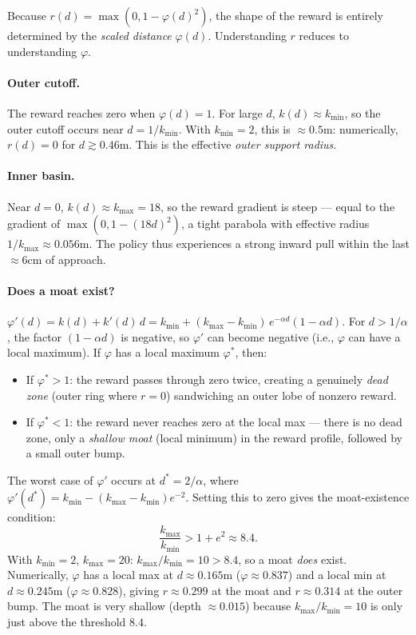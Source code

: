 \documentclass{article}
\begin{document}
Because $r(d) = \max(0, 1 - \varphi(d)^2)$, the shape of the reward is entirely
determined by the \emph{scaled distance} $\varphi(d)$. Understanding $r$ reduces to
understanding $\varphi$.

\paragraph{Outer cutoff.}
The reward reaches zero when $\varphi(d) = 1$. For large $d$, $k(d) \approx k_{\min}$,
so the outer cutoff occurs near $d = 1/k_{\min}$. With $k_{\min}=2$, this is $\approx 0.5$m:
numerically, $r(d) = 0$ for $d \gtrsim 0.46$m. This is the effective \emph{outer support radius}.

\paragraph{Inner basin.}
Near $d=0$, $k(d) \approx k_{\max} = 18$, so the reward gradient is steep ---
equal to the gradient of $\max(0, 1-(18d)^2)$, a tight parabola with effective radius
$1/k_{\max} \approx 0.056$m. The policy thus experiences a strong inward pull within
the last $\approx 6$cm of approach.

\paragraph{Does a moat exist?}
$\varphi'(d) = k(d) + k'(d)\,d = k_{\min} + (k_{\max}-k_{\min})\,e^{-\alpha d}(1 - \alpha d)$.
For $d > 1/\alpha$, the factor $(1-\alpha d)$ is negative, so $\varphi'$ can become
negative (i.e., $\varphi$ can have a local maximum). If $\varphi$ has a local maximum
$\varphi^*$, then:
\begin{itemize}
    \item If $\varphi^* > 1$: the reward passes through zero twice, creating a
    genuinely \emph{dead zone} (outer ring where $r=0$) sandwiching an outer lobe
    of nonzero reward.
    \item If $\varphi^* < 1$: the reward never reaches zero at the local max ---
    there is no dead zone, only a \emph{shallow moat} (local minimum) in the
    reward profile, followed by a small outer bump.
\end{itemize}
The worst case of $\varphi'$ occurs at $d^* = 2/\alpha$, where
$\varphi'(d^*) = k_{\min} - (k_{\max}-k_{\min})e^{-2}$.
Setting this to zero gives the moat-existence condition:
\begin{equation}
    \frac{k_{\max}}{k_{\min}} > 1 + e^{2} \approx 8.4.
    \label{eq:moat}
\end{equation}
With $k_{\min}=2$, $k_{\max}=20$: $k_{\max}/k_{\min} = 10 > 8.4$, so a moat
\emph{does} exist. Numerically, $\varphi$ has a local max at $d\approx 0.165$m
($\varphi \approx 0.837$) and a local min at $d\approx 0.245$m ($\varphi \approx 0.828$),
giving $r \approx 0.299$ at the moat and $r \approx 0.314$ at the outer bump. The moat
is very shallow (depth $\approx 0.015$) because $k_{\max}/k_{\min} = 10$ is only just above
the threshold $8.4$.
\end{document}
